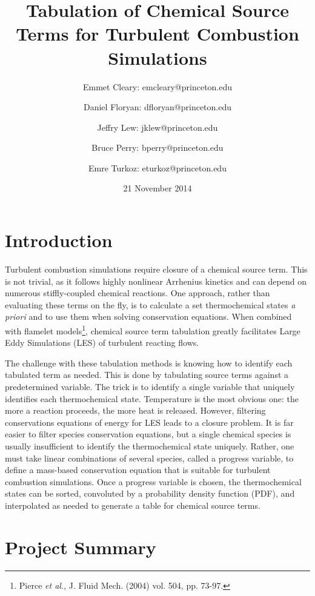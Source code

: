 \documentclass[11pt]{article}
\begin{document}
\title{\textbf{Tabulation of Chemical Source Terms for Turbulent
    Combustion Simulations}}

\author{Emmet Cleary: emcleary@princeton.edu \and Daniel Floryan:
  dfloryan@princeton.edu \and Jeffry Lew: jklew@princeton.edu \and
  Bruce Perry: bperry@princeton.edu \and Emre Turkoz:
  eturkoz@princeton.edu} 

\date{21 November 2014 }
\maketitle

\section{Introduction}

Turbulent combustion simulations require closure of a chemical source
term. This is not trivial, as it follows highly nonlinear Arrhenius
kinetics and can depend on numerous stiffly-coupled chemical
reactions. One approach, rather than evaluating these terms on the
fly, is to calculate a set thermochemical states \textit{a priori} and
to use them when solving conservation equations. When combined with
flamelet models\footnote{Pierce \textit{et al.}, J. Fluid Mech. (2004)
  vol. 504, pp. 73-97.}, chemical source term tabulation greatly
facilitates Large Eddy Simulations (LES) of turbulent reacting flows.

The challenge with these tabulation methods is knowing how to identify
each tabulated term as needed.  This is done by tabulating source
terms against a predetermined variable. The trick is to identify a
single variable that uniquely identifies each thermochemical
state. Temperature is the most obvious one: the more a reaction
proceeds, the more heat is released. However, filtering conservations
equations of energy for LES leads to a closure problem. It is far
easier to filter species conservation equations, but a single chemical
species is usually insufficient to identify the thermochemical state
uniquely. Rather, one must take linear combinations of several
species, called a progress variable, to define a mass-based
conservation equation that is suitable for turbulent combustion
simulations. Once a progress variable is chosen, the thermochemical
states can be sorted, convoluted by a probability density function
(PDF), and interpolated as needed to generate a table for chemical
source terms.

\section{Project Summary}
\end{document}
